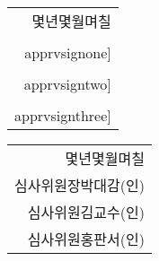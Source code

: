 \documentclass[a4paper]{article}
\makeatletter
\newenvironment{myepigraph}
{\par\hfill
	\begin{tabular}{@{}r@{\hspace{20mm}}}%
	}%
	{%
	\end{tabular}\par\medskip}
\def\apprvsignone{parkdaegam.png}	%
\def\apprvsigntwo{ntiea.png}		%
\def\apprvsignthree{hongpanseo.png}	%
\def\apprvsign{(인)}
\newlength{\apprvsignonewidth}
\newlength{\apprvsigntwowidth}
\newlength{\apprvsignthreewidth}
\makeatother
\begin{document}
	
	\vspace*{3em}
	
	\begin{myepigraph}
		{\Large {몇년몇월며칠}}\\[11mm]
		{\Large 
		심사위원장\hspace{5mm}박대감\hspace{6mm}%
		\trimbox{%
			{\apprvsignonewidth/2-2.67mm} 6mm %
			{\apprvsignonewidth/2-2.67mm} 6mm}
		{%
			\begin{tikzpicture}
			\draw (0,0) 
			node {%
				\texttt{[image: \\apprvsignone]}};
				\draw (0,0) node {\apprvsign};
			\end{tikzpicture}}%
		}\\[8mm]
		{\Large 
		심사위원\hspace{5mm}김교수\hspace{6mm}%
		\trimbox{%
			{\apprvsigntwowidth/2-2.67mm} 6mm %
			{\apprvsigntwowidth/2-2.67mm} 6mm}
		{%
			\begin{tikzpicture}
			\draw (0,0) 
			node 
			{%
				\texttt{[image: \\apprvsigntwo]}};
				\draw (0,0) node {\apprvsign};
			\end{tikzpicture}}%
		}\\[8mm]
		{\Large 
		심사위원\hspace{5mm}홍판서\hspace{6mm}%
		\trimbox{%
			{\apprvsignthreewidth/2-2.67mm} 6mm %
			{\apprvsignthreewidth/2-2.67mm} 6mm}
		{%
			\begin{tikzpicture}
			\draw (0,0) 
			node {%
				\texttt{[image: \\apprvsignthree]}};
				\draw (0,0) node {\apprvsign};
			\end{tikzpicture}}%
		}
	\end{myepigraph}


	\vspace{3em}

	\begin{myepigraph}
	{\Large {몇년몇월며칠}}\\[11mm]
	{\Large 심사위원장\hspace{5mm}박대감\hspace{6mm}(인)}\\[8mm]
	{\Large 심사위원\hspace{5mm}김교수\hspace{6mm}(인)}\\[8mm]
	{\Large 심사위원\hspace{5mm}홍판서\hspace{6mm}(인)}
	\end{myepigraph}
\end{document}
